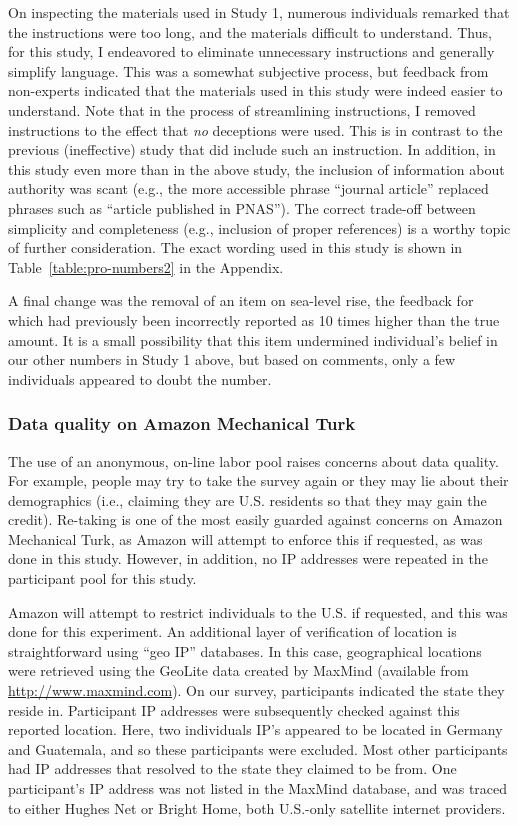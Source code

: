 On inspecting the materials used in Study 1, numerous individuals remarked that
the instructions were too long, and the materials difficult to understand. Thus,
for this study, I endeavored to eliminate unnecessary instructions and generally
simplify language. This was a somewhat subjective process, but feedback from
non-experts indicated that the materials used in this study were indeed easier
to understand. Note that in the process of streamlining instructions, I removed
instructions to the effect that \emph{no} deceptions were used. This is in
contrast to the previous (ineffective) study that did include such an
instruction.  In addition, in this study even more than in the above study, the
inclusion of information about authority was scant (e.g., the more accessible
phrase “journal article” replaced phrases such as “article published in PNAS”).
The correct trade-off between simplicity and completeness (e.g., inclusion of
proper references) is a worthy topic of further consideration.  The exact
wording used in this study is shown in Table~\ref{table:pro-numbers2} in the
Appendix.

A final change was the removal of an item on sea-level rise, the feedback for
which had previously been incorrectly reported as 10 times higher than the true
amount. It is a small possibility that this item undermined individual's belief
in our other numbers in Study 1 above, but based on comments, only a few
individuals appeared to doubt the number.

\subsubsection{Data quality on Amazon Mechanical Turk}
\label{sec:mturk-problems}

The use of an anonymous, on-line labor pool raises concerns about data quality.
For example, people may try to take the survey again or they may lie about their
demographics (i.e., claiming they are U.S. residents so that they may gain the
credit). Re-taking is one of the most easily guarded against concerns on Amazon
Mechanical Turk, as Amazon will attempt to enforce this if requested, as was
done in this study. However, in addition, no IP addresses were repeated in the
participant pool for this study.

Amazon will attempt to restrict individuals to the U.S. if requested, and this
was done for this experiment. An additional layer of verification of location is
straightforward using “geo IP” databases. In this case, geographical locations
were retrieved using the GeoLite data created by MaxMind (available from
\url{http://www.maxmind.com}). On our survey, participants indicated the state
they reside in. Participant IP addresses were subsequently checked against this
reported location. Here, two individuals IP’s appeared to be located in Germany
and Guatemala, and so these participants were excluded. Most other
participants had IP addresses that resolved to the state they claimed to be
from. One participant’s IP address was not listed in the MaxMind database, and
was traced to either Hughes Net or Bright Home, both U.S.-only satellite
internet providers.

